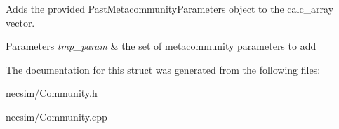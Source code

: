 Adds the provided Past\+Metacommunity\+Parameters object to the calc\+\_\+array vector. 


\begin{DoxyParams}{Parameters}
{\em tmp\+\_\+param} & the set of metacommunity parameters to add \\
\hline
\end{DoxyParams}


The documentation for this struct was generated from the following files\+:\begin{DoxyCompactItemize}
\item 
necsim/Community.\+h\item 
necsim/Community.\+cpp\end{DoxyCompactItemize}
